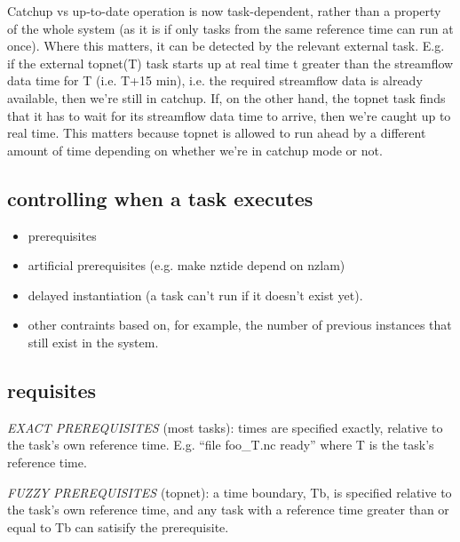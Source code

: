 \documentclass[12pt]{article}
\begin{document}
Catchup vs up-to-date operation is now task-dependent, rather than a
property of the whole system (as it is if only tasks from the same
reference time can run at once).  Where this matters, it can be detected
by the relevant external task. E.g. if the external topnet(T) task
starts up at real time t greater than the streamflow data time for T
(i.e. T+15 min), i.e. the required streamflow data is already available,
then we're still in catchup. If, on the other hand, the topnet task
finds that it has to wait for its streamflow data time to arrive, then
we're caught up to real time.  This matters because topnet is allowed to
run ahead by a different amount of time depending on whether we're in
catchup mode or not.


\subsection{controlling when a task executes}

\begin{itemize}
 \item  prerequisites
 \item artificial prerequisites (e.g. make nztide depend on nzlam)
 \item delayed instantiation (a task can't run if it doesn't exist yet).
 \item other contraints based on, for example, the number of previous instances
       that still exist in the system.
\end{itemize}


\subsection{requisites}

{\em EXACT PREREQUISITES} (most tasks): times are specified exactly,
relative to the task's own reference time.  E.g. ``file foo\_{T}.nc
ready'' where T is the task's reference time.

{\em FUZZY PREREQUISITES} (topnet): a time boundary, Tb, is specified
relative to the task's own reference time, and any task with a reference
time greater than or equal to Tb can satisify the prerequisite.
\end{document}
